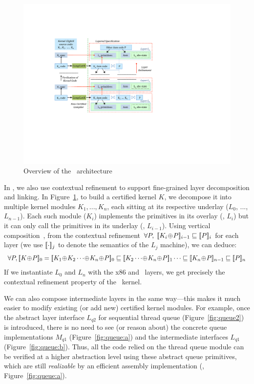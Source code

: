 \begin{figure}[tb] \centering
\includegraphics[scale=1]{figs/archA}
\caption{Overview of the \CTOS\ architecture}
\hrulefill
\label{fig:arch}
\end{figure}

In \CTOS, we also use contextual refinement to support fine-grained
layer decomposition and linking.  In Figure~\ref{fig:arch}, to build a
certified kernel $K$, we decompose it into multiple kernel modules
$K_1,...,K_n$, each sitting at its respective underlay ($L_0$, ...,
$L_{n-1}$). Each such module ($K_i$) implements the primitives in its
overlay (\ie, $L_i$) but it can only call the primitives in its
underlay (\ie, $L_{i-1}$).  Using vertical composition~\cite{dscal15}, from
the contextual refinement $\forall
P,\;\sem{i-1}{K_i\join{}P}\Refrel{}\sem{i}{P}$ for each layer (we use
$\sem{j}{\cdot}$ to denote the semantics of the $L_j$ machine), we can
deduce:
$$\forall P, \sem{0}{K\join{}P} =
\sem{0}{K_1\join{}K_2\cdots\join{}K_n\join{}P} \Refrel
\sem{1}{K_2\cdots\join{}K_n\join{}P} \cdots \Refrel
\sem{n-1}{K_n\join{}P} \Refrel \sem{n}{P}$$
If we instantiate $L_0$
and $L_n$ with the x86 and \mCTOS\ layers, we get precisely the
contextual refinement property of the \mCTOS\ kernel. 

We can also
compose intermediate layers in the same way---this makes it much
easier to modify existing (or add new) certified kernel modules.
For example, once the abstract layer interface
$L_{q2}$
for sequential thread queue (\cf{}Figure~\ref{fig:queue2}) is introduced,
there is no need to see (or reason about) 
the concrete queue implementations $M_{q1}$
(\cf{}Figure~\ref{fig:queue:a})
and the intermediate interfaces $L_{q1}$ (\cf{}Figure~\ref{fig:queue:b}). 
Thus, all the code relied on the thread queue module can be verified
at a higher abstraction level using these abstract queue primitives,
which are still {\em realizable} by an efficient assembly implementation
(\ie, Figure~\ref{fig:queue:a}).


